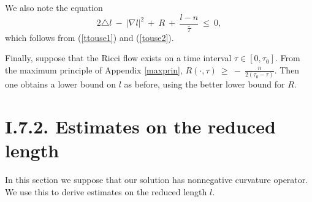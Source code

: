 We also note the equation
\begin{equation} \label{illustrate2}
2 \triangle l \: - \: |\nabla l|^2  \: + \: R \:  + \:
\frac{l-n}{\overline{\tau}} \: \le \: 0,
\end{equation}
which follows from (\ref{ttouse1}) and
(\ref{touse2}).

Finally, suppose that the Ricci flow exists on a time interval
$\tau \in [0, \tau_0]$. From the maximum principle of
Appendix \ref{maxprin}, $R(\cdot, \tau) \: \ge \: - \: \frac{n}{2(\tau_0 - \tau)}$.
Then one obtains a lower bound on $l$ as before, using the
better lower bound for $R$.

\section{I.7.2. Estimates on the reduced length}

In this section we
suppose that our solution has nonnegative curvature operator.
We use this to derive estimates on the reduced length $l$.

